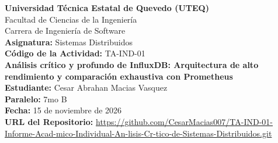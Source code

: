 \documentclass[12pt,a4paper]{article}
\begin{document}
\begin{titlepage}
    \centering
    \vspace*{2cm}
    
    {\Large \textbf{Universidad Técnica Estatal de Quevedo (UTEQ)}}\\[0.5cm]
    {\large Facultad de Ciencias de la Ingeniería}\\[0.5cm]
    {\large Carrera de Ingeniería de Software}\\[2cm]
    
    {\large \textbf{Asignatura:} Sistemas Distribuidos}\\[0.5cm]
    {\large \textbf{Código de la Actividad:} TA-IND-01}\\[1.5cm]
    
    {\Large \textbf{Análisis crítico y profundo de InfluxDB: Arquitectura de alto rendimiento y comparación exhaustiva con Prometheus}}\\[2cm]
    
    {\large \textbf{Estudiante:} Cesar Abrahan Macias Vasquez}\\[0.5cm]
    {\large \textbf{Paralelo:} 7mo B}\\[0.5cm]
    {\large \textbf{Fecha:} 15 de noviembre de 2026}\\[1cm]
    
    {\large \textbf{URL del Repositorio:} \url{https://github.com/CesarMacias007/TA-IND-01-Informe-Acad-mico-Individual-An-lisis-Cr-tico-de-Sistemas-Distribuidos.git}}
    
    \vfill
\end{titlepage}

\begin{abstract}
Este informe técnico presenta una disección arquitectónica avanzada de InfluxDB, una base de datos distribuida de series temporales (TSDB) orientada a la ingesta masiva y telemetría de alta frecuencia. El análisis aborda la partición lógica del clúster entre Nodos Meta (gobernados por el algoritmo de consenso Raft para garantizar consistencia fuerte) y Nodos de Datos (optimizados para disponibilidad mediante motores \textit{Time-Structured Merge Tree} y colas \textit{Hinted Handoff}). A través del prisma del Teorema CAP y la extensión PACELC, se evalúan las concesiones de consistencia eventual frente a particiones de red. Asimismo, se desarrolla una comparativa crítica de los modelos de comunicación asincrónicos (\textit{Push} vs. \textit{Pull}) frente al ecosistema de Prometheus, demostrando las ventajas estructurales de InfluxDB en topologías con cortafuegos restrictivos y dispositivos efímeros (IoT). El estudio se consolida con un despliegue experimental efímero basado en contenedores Docker y validación a través de peticiones HTTP nativas.
\end{abstract}
\end{document}
